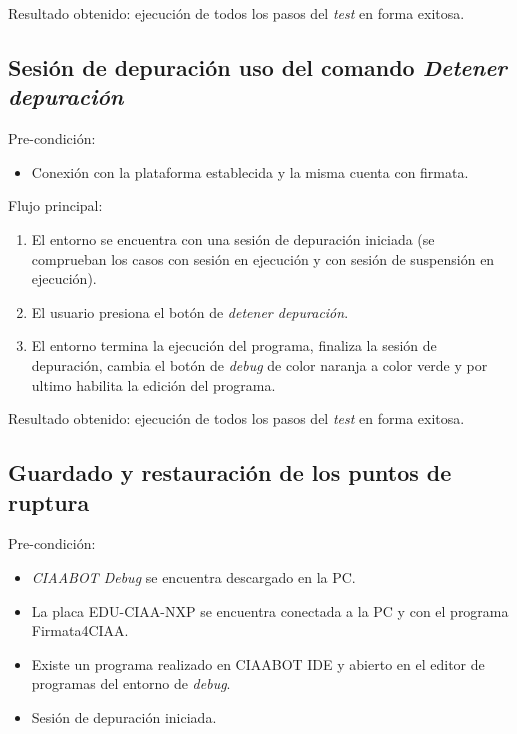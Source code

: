 Resultado obtenido: ejecución de todos los pasos del \emph{test} en forma exitosa. 


\subsection{Sesión de depuración uso del comando \emph{Detener depuración}}
Pre-condición:
\begin{itemize}
	\item Conexión con la plataforma establecida y la misma cuenta con firmata.
\end{itemize}

Flujo principal:
\begin{enumerate}
	\item
El entorno se encuentra con una sesión de depuración iniciada (se comprueban los casos con sesión en ejecución y con sesión de suspensión en ejecución).
	\item
	El usuario presiona el botón de \emph{detener depuración}.
	\item
	El entorno termina la ejecución del programa, finaliza la sesión de depuración, cambia el botón de \emph{debug} de color naranja a color verde y por ultimo habilita la edición del programa.
\end{enumerate}

Resultado obtenido: ejecución de todos los pasos del \emph{test} en forma exitosa. 

\subsection{Guardado y restauración de los puntos de ruptura}
Pre-condición:
\begin{itemize}
	\item \emph{CIAABOT Debug} se encuentra descargado en la PC.
    \item La placa EDU-CIAA-NXP se encuentra conectada a la PC y con el programa Firmata4CIAA.
    \item Existe un programa realizado en CIAABOT IDE y abierto en el editor de programas del entorno de \emph{debug}.
    \item Sesión de depuración iniciada.
\end{itemize}

